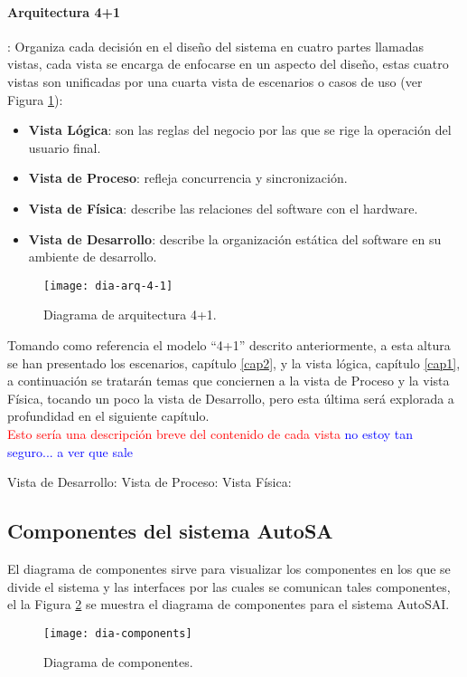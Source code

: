 \paragraph*{Arquitectura 4+1}: Organiza cada decisión en el diseño del sistema en cuatro partes llamadas vistas, cada vista se encarga de enfocarse en un aspecto del diseño, estas cuatro vistas son unificadas por una cuarta vista de escenarios o casos de uso (ver Figura \ref{fig:dia-arq-4-1}):
\begin{itemize}
	\item \textbf{Vista Lógica}: son las reglas del negocio por las que se rige la operación del usuario final.
	\item \textbf{Vista de Proceso}: refleja concurrencia y sincronización.
	\item \textbf{Vista de Física}: describe las relaciones del software con el hardware.
	\item \textbf{Vista de Desarrollo}: describe la organización estática del software en su ambiente de desarrollo.\cite{ViewModel4plus1}
\end{itemize}

\begin{figure}[h]
\centering
\texttt{[image: dia-arq-4-1]} 
\caption{Diagrama de arquitectura 4+1.}
\label{fig:dia-arq-4-1}
\end{figure}

Tomando como referencia el modelo ``4+1'' descrito anteriormente, a esta altura se han presentado los escenarios, capítulo \ref{cap2}, y la vista lógica, capítulo \ref{cap1}, a continuación se tratarán temas que conciernen a la vista de Proceso y la vista Física, tocando un poco la vista de Desarrollo, pero esta última será explorada a profundidad en el siguiente capítulo.\\

\textcolor{red}{Esto sería una descripción breve del contenido de cada vista}
\textcolor{blue}{no estoy tan seguro... a ver que sale}

Vista de Desarrollo:
Vista de Proceso:
Vista Física:

\subsection{Componentes del sistema AutoSA}
El diagrama de componentes sirve para visualizar los componentes en los que se divide el sistema y las interfaces por las cuales se comunican tales componentes, el la Figura \ref{fig:dia-components} se muestra el diagrama de componentes para el sistema AutoSAI.
\begin{figure}[h]
\centering
\texttt{[image: dia-components]}
\caption{Diagrama de componentes.}
\label{fig:dia-components}
\end{figure}

